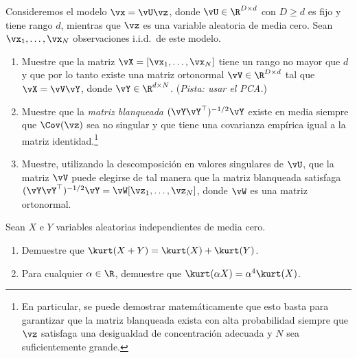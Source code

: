 \documentclass[../../book-main.tex]{subfiles}
\begin{document}
\begin{exercise}\label{exercise:whitening}
    Consideremos el modelo $\vx = \vU \vz$, donde $\vU \in \R^{D \times
    d}$ con $D \geq d$ es fijo y tiene rango $d$, mientras que $\vz$ es una
    variable aleatoria de media cero. Sean $\vx_1, \dots, \vx_N$ observaciones i.i.d.\ de este modelo.
    \begin{enumerate}
        \item Muestre que la matriz $\vX = [\vx_1, \dots, \vx_N]$ tiene
            un rango no mayor que $d$ y que por lo tanto existe una
            matriz ortonormal $\vV \in \R^{D \times d}$ tal que $\vX
            = \vV \vY$, donde $\vY \in \R^{d \times N}$.
            (\textit{Pista: usar el PCA.})
        \item Muestre que la \textit{matriz blanqueada} $(\vY
            \vY^\top)^{-1/2}\vY$ existe en media siempre que
            $\Cov(\vz)$ sea no singular y que tiene una covarianza
            empírica igual a la matriz identidad.\footnote{En particular, se puede
                demostrar matemáticamente que esto basta para garantizar
                que la matriz blanqueada exista con alta probabilidad
                siempre que $\vz$ satisfaga una desigualdad de concentración
            adecuada y $N$ sea suficientemente grande.}
        \item Muestre, utilizando la descomposición en valores singulares de
            $\vU$, que la matriz $\vV$ puede elegirse de tal manera que la
            matriz blanqueada satisfaga $(\vY \vY^\top)^{-1/2} \vY =
            \vW [\vz_1, \dots, \vz_N]$, donde $\vW$ es una matriz ortonormal. 
    \end{enumerate}
\end{exercise}

\begin{exercise}\label{exercise:kurtosis-linearity-properties}
    Sean $X$ e $Y$ variables aleatorias independientes de media cero.
    \begin{enumerate}
        \item Demuestre que $\kurt(X + Y) = \kurt(X) + \kurt(Y)$. 
        \item Para cualquier $\alpha \in \R$, demuestre que $\kurt(\alpha X) =
            \alpha^4 \kurt(X)$. 
    \end{enumerate}
\end{exercise}
\end{document}

